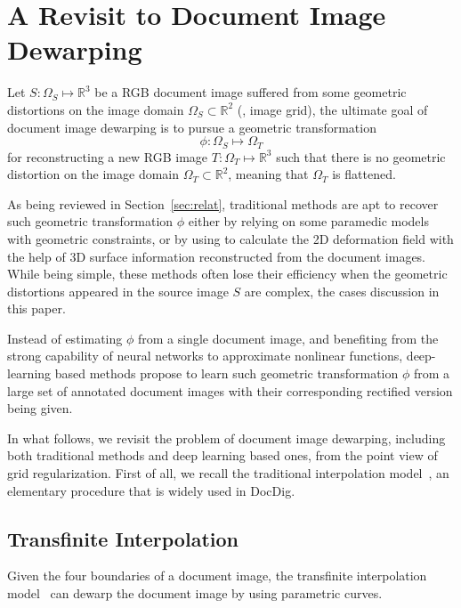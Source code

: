 \documentclass[10pt,twocolumn,letterpaper]{article}
\begin{document}
\section{A Revisit to Document Image Dewarping}

Let $S:\Omega_S \mapsto \mathbb{R}^3$ be a RGB document image suffered from some geometric distortions on the image domain $\Omega_S \subset \mathbb{R}^2$ (\ie, image grid), the ultimate goal of document image dewarping is to pursue a geometric transformation 
$$
\phi: \Omega_S \mapsto \Omega_T
$$ 
for reconstructing a new RGB image $T: \Omega_T \mapsto \mathbb{R}^3$ such that there is no geometric distortion on the image domain $\Omega_T \subset \mathbb{R}^2$, meaning that $\Omega_T$ is flattened.

As being reviewed in Section~\ref{sec:relat}, traditional methods are apt to recover such geometric transformation $\phi$ either by relying on some paramedic models with geometric constraints, or by using to calculate the 2D deformation field with the help of 3D surface information reconstructed from the document images. While being simple, these methods often lose their efficiency when the geometric distortions appeared in the source image $S$ are complex, \eg the cases discussion in this paper.

Instead of estimating $\phi$ from a single document image, and benefiting from the strong capability of neural networks to approximate nonlinear functions, deep-learning based methods propose to learn such geometric transformation $\phi$ from a large set of annotated document images with their corresponding rectified version being given.   

In what follows, we revisit the problem of document image dewarping, including both traditional methods and deep learning based ones, from the point view of grid regularization.
First of all, we recall the traditional interpolation model~\cite{tsoi2007multi}, an elementary procedure that is widely used in DocDig.  
\vspace{-0.5em}

\subsection{Transfinite Interpolation} 
 
Given the four boundaries of a document image, the transfinite interpolation model~\cite{tsoi2007multi} can dewarp the document image by using parametric curves.
 
\end{document}
